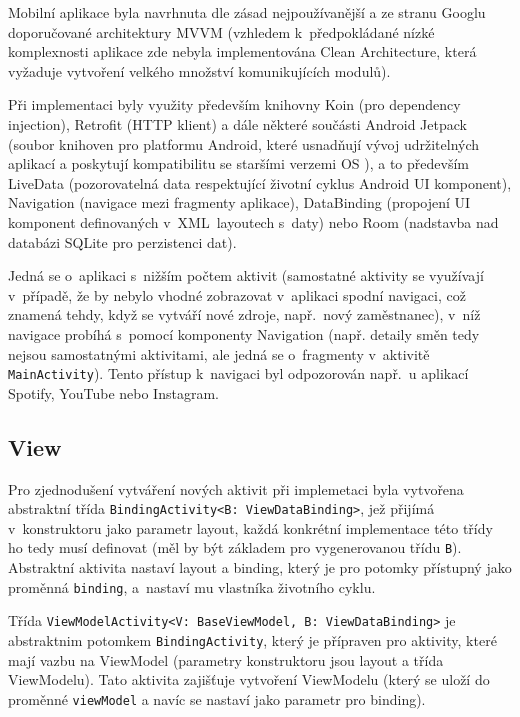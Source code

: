 \documentclass[twoside]{ctuthesis}
\begin{document}
\begin{enumerate}[label=\textbf{O\arabic*.}]
Mobilní aplikace byla navrhnuta dle zásad nejpoužívanější a ze stranu Googlu doporučované architektury MVVM (vzhledem k~před\-po\-klá\-da\-né nízké komplexnosti aplikace zde nebyla implementována Clean Architecture, která vyžaduje vytvoření velkého množství komunikujících modulů).

Při implementaci byly využity především knihovny Koin (pro dependency injection), Retrofit (HTTP klient) a dále některé součásti Android Jetpack (soubor knihoven pro platformu Android, které usnadňují vývoj udržitelných aplikací a poskytují kompatibilitu se staršími verzemi OS \cite{android2020jetpack}), a to především LiveData (pozorovatelná data respektující životní cyklus Android UI komponent), Navigation (navigace mezi fragmenty aplikace), DataBinding (propojení UI komponent definovaných v~XML~layoutech s~daty) nebo Room (nadstavba nad databázi SQLite pro perzistenci dat).

Jedná se o~aplikaci s~nižším počtem aktivit (samostatné aktivity se využívají v~případě, že by nebylo vhodné zobrazovat v~aplikaci spodní navigaci, což znamená tehdy, když se vytváří nové zdroje, např.~nový zaměstnanec), v~níž navigace probíhá s~pomocí komponenty Navigation (např. detaily směn tedy nejsou sa\-mos\-tat\-ný\-mi aktivitami, ale jedná se o~fragmenty v~aktivitě \texttt{MainActivity}). Tento přístup k~navigaci byl odpozorován např.~u aplikací Spotify, YouTube nebo Instagram.

\subsection{View}

Pro zjednodušení vytváření nových aktivit při implemetaci byla vytvořena abstraktní třída \texttt{BindingActivity<B: ViewDataBinding>}, jež přijímá v~kon\-struk\-to\-ru jako parametr layout, každá konkrétní implementace této třídy ho tedy musí definovat (měl by být základem pro vygenerovanou třídu \texttt{B}). Abstraktní aktivita nastaví layout a binding, který je pro potomky přístupný jako proměnná \texttt{binding}, a~nastaví mu vlastníka životního cyklu.

Třída \texttt{ViewModelActivity<V: BaseViewModel, B:  ViewDataBinding>} je abstraktnim potomkem \texttt{BindingActivity}, který je přípraven pro aktivity, které mají vazbu na ViewModel (parametry konstruktoru jsou layout a třída ViewModelu). Tato aktivita zajišťuje vytvoření ViewModelu (který se uloží do proměnné \texttt{viewModel} a navíc se nastaví jako parametr pro binding).


\end{enumerate}
\end{document}
